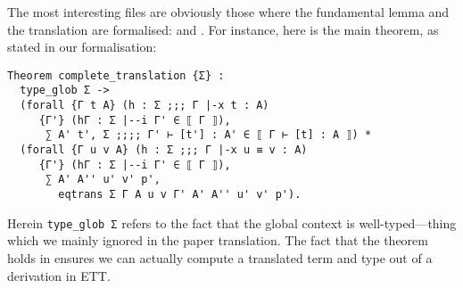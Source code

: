 The most interesting files are obviously those where the fundamental lemma
and the translation are formalised:  and
.
For instance, here is the main theorem, as stated in our formalisation:
%
\begin{verbatim}
Theorem complete_translation {Σ} :
  type_glob Σ ->
  (forall {Γ t A} (h : Σ ;;; Γ |-x t : A)
     {Γ'} (hΓ : Σ |--i Γ' ∈ ⟦ Γ ⟧),
      ∑ A' t', Σ ;;;; Γ' ⊢ [t'] : A' ∈ ⟦ Γ ⊢ [t] : A ⟧) *
  (forall {Γ u v A} (h : Σ ;;; Γ |-x u ≡ v : A)
     {Γ'} (hΓ : Σ |--i Γ' ∈ ⟦ Γ ⟧),
      ∑ A' A'' u' v' p',
        eqtrans Σ Γ A u v Γ' A' A'' u' v' p').
\end{verbatim}
%
Herein \texttt{type_glob Σ} refers to the fact that the global
context is well-typed---thing which we mainly ignored in the paper translation.
The fact that the theorem holds in \Coq ensures we can actually
compute a translated term and type out of a derivation in \acrshort{ETT}.




